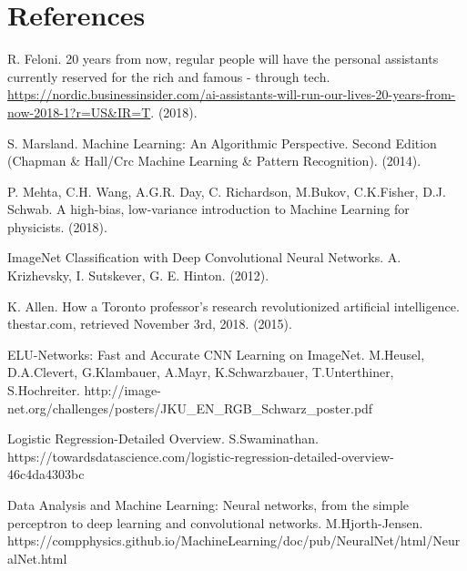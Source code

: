 \newpage
\section{References}

\begingroup
\renewcommand{\section}[2]{}
\begin{thebibliography}{}
	R. Feloni.
	20 years from now, regular people will have the personal assistants currently reserved for the rich and famous - through tech.
	\url{https://nordic.businessinsider.com/ai-assistants-will-run-our-lives-20-years-from-now-2018-1?r=US&IR=T}.
	(2018).
	
	S. Marsland.
	Machine Learning: An Algorithmic Perspective. Second Edition (Chapman \& Hall/Crc Machine Learning \& Pattern Recognition).
	(2014).
	
	P. Mehta, C.H. Wang, A.G.R. Day, C. Richardson, M.Bukov, C.K.Fisher, D.J. Schwab.
	A high-bias, low-variance introduction to Machine Learning for physicists.
	(2018).
	
	ImageNet Classification with Deep Convolutional Neural Networks.
	A. Krizhevsky, I. Sutskever, G. E. Hinton.
	(2012).
	
	K. Allen.
	How a Toronto professor’s research revolutionized artificial intelligence.
	thestar.com, retrieved November 3rd, 2018.
	(2015).
	
	ELU-Networks: Fast and Accurate CNN Learning on ImageNet.
	M.Heusel, D.A.Clevert, G.Klambauer, A.Mayr, K.Schwarzbauer, T.Unterthiner, S.Hochreiter.
	http://image-net.org/challenges/posters/JKU\_EN\_RGB\_Schwarz\_poster.pdf
	
	Logistic Regression-Detailed Overview.
	S.Swaminathan.
	https://towardsdatascience.com/logistic-regression-detailed-overview-46c4da4303bc
	
	Data Analysis and Machine Learning: Neural networks, from the simple perceptron to deep learning and convolutional networks.
	M.Hjorth-Jensen.
	https://compphysics.github.io/MachineLearning/doc/pub/NeuralNet/html/NeuralNet.html
	
\end{thebibliography}
\endgroup